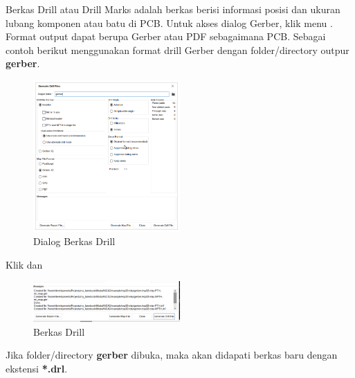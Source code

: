 \documentclass[12pt]{book}
\begin{document}
	Berkas Drill atau Drill Marks adalah berkas berisi informasi posisi dan ukuran lubang komponen atau batu di PCB.
	Untuk akses dialog Gerber, klik menu .
	Format output dapat berupa Gerber atau PDF sebagaimana PCB.
	Sebagai contoh berikut menggunakan format drill Gerber dengan folder/directory outpur \textbf{gerber}.

	\begin{figure}[!ht]
		\centering
		\includegraphics[width=0.5\textwidth]{images/fab/fab_6}
		\caption{Dialog Berkas Drill}
	\end{figure}

	\newpage
	Klik  dan 

	\begin{figure}[!ht]
		\centering
		\includegraphics[width=0.5\textwidth]{images/fab/fab_7}
		\caption{Berkas Drill}
	\end{figure}

	Jika folder/directory \textbf{gerber} dibuka, maka akan didapati berkas baru dengan ekstensi \textbf{*.drl}.
\end{document}
